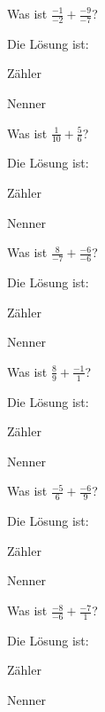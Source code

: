 \documentclass{ximera}
\begin{document}
\begin{shuffle}
\begin{question}
Was ist $\frac{-1}{-2} + \frac{-9}{-7}$?
\begin{solution}
Die Lösung ist:

Zähler 

Nenner 
\end{solution}
\end{question}


\begin{question}
Was ist $\frac{1}{10} + \frac{5}{6}$?
\begin{solution}
Die Lösung ist:

Zähler 

Nenner 
\end{solution}
\end{question}


\begin{question}
Was ist $\frac{8}{-7} + \frac{-6}{-6}$?
\begin{solution}
Die Lösung ist:

Zähler 

Nenner 
\end{solution}
\end{question}


\begin{question}
Was ist $\frac{8}{9} + \frac{-1}{1}$?
\begin{solution}
Die Lösung ist:

Zähler 

Nenner 
\end{solution}
\end{question}


\begin{question}
Was ist $\frac{-5}{6} + \frac{-6}{9}$?
\begin{solution}
Die Lösung ist:

Zähler 

Nenner 
\end{solution}
\end{question}


\begin{question}
Was ist $\frac{-8}{-6} + \frac{-7}{1}$?
\begin{solution}
Die Lösung ist:

Zähler 

Nenner 
\end{solution}
\end{question}



\end{shuffle}
\end{document}
